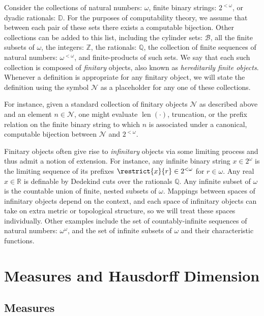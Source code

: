 Consider the collections of natural numbers: $\omega$, finite binary strings: $2^{<\omega}$, or dyadic rationals: $\mathbb{D}$. For the purposes of computability theory, we assume that between each pair of these sets there exists a computable bijection. Other collections can be added to this list, including the cylinder sets: $\mathcal{B}$, all the finite subsets of $\omega$, the integers: $\mathbb{Z}$, the rationals: $\mathbb{Q}$, the collection of finite sequences of natural numbers: $\omega^{<\omega}$, and finite-products of such sets. We say that each such collection is composed of \textit{finitary} objects, also known as \textit{hereditarily finite objects}. Whenever a definition is appropriate for any finitary object, we will state the definition using the symbol $\mathscr{N}$ as a placeholder for any one of these collections. 

For instance, given a standard collection of finitary objects $\mathscr{N}$ as described above and an element $n \in \mathscr{N}$, one might evaluate $\operatorname{len}(\cdot)$, truncation, or the prefix relation on the finite binary string to which $n$ is associated under a canonical, computable bijection between $\mathscr{N}$ and $2^{<\omega}$. 

Finitary objects often give rise to \textit{infinitary} objects via some limiting process and thus admit a notion of extension. For instance, any infinite binary string $x \in 2^\omega$ is the limiting sequence of its prefixes $\restrict{x}{r} \in 2^{<\omega}$ for $r \in \omega$. Any real $x \in \mathbb{R}$ is definable by Dedekind cuts over the rationals $\mathbb{Q}$. Any infinite subset of $\omega$ is the countable union of finite, nested subsets of $\omega$. Mappings between spaces of infinitary objects depend on the context, and each space of infinitary objects can take on extra metric or topological structure, so we will treat these spaces individually. Other examples include the set of countably-infinite sequences of natural numbers: $\omega^\omega$, and the set of infinite subsets of $\omega$ and their characteristic functions.

\section{Measures and Hausdorff Dimension} \label{section:Measures_and_Hausdorff_Dimension}

\subsection{Measures}

